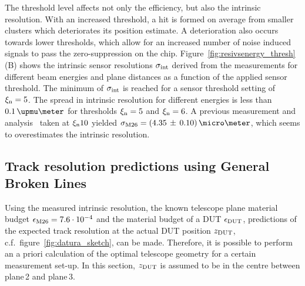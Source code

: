 The threshold level affects not only the efficiency, but also the intrinsic resolution. 
With an increased threshold, a hit is formed on average from smaller clusters which deteriorates its position estimate. 
A deterioration also occurs towards lower thresholds, which allow for an increased number of noise induced signals to pass the zero-suppression on the chip.
Figure~\ref{fig:resivsenergy_thresh} (B) shows the intrinsic sensor resolutions $\sigma_{\textrm{int}}$ derived from the measurements for different beam energies and plane distances as a function of the applied sensor threshold.
The minimum of $\sigma_{\textrm{int}}$ is reached for a sensor threshold setting of $\xi_{\textrm{n}} = 5$.
The spread in intrinsic resolution for different energies is less than $0.1\,\upmu\meter$ for thresholds $\xi_{\textrm{n}} = 5$ and $\xi_{\textrm{n}} = 6$. 
A previous measurement and analysis~\cite{ref:j.behrmeasurements} taken at $\xi_{\textrm{n}}10$ yielded $\sigma_{\textrm{M26}} = (4.35\,\pm\,0.10)\,\micro\meter$,
 which seems to overestimates the intrinsic resolution. 



\subsection{Track resolution predictions using General Broken Lines}

% 
Using the measured intrinsic resolution, the known telescope plane material budget $\mathnormal{\epsilon_{\textrm{M26}}} = 7.6\cdot 10^{-4}$ and the material budget of a DUT $\mathnormal{\epsilon_{\textrm{DUT}}}$,
 predictions of the expected track resolution at the actual DUT position $z_{\textrm{DUT}}$, c.f.\ figure~\ref{fig:datura_sketch}, can be made.
Therefore, it is possible to perform an a priori calculation of the optimal telescope geometry for a certain measurement set-up. 
In this section, $z_{\textrm{DUT}}$ is assumed to be in the centre between plane\,2 and plane\,3.


